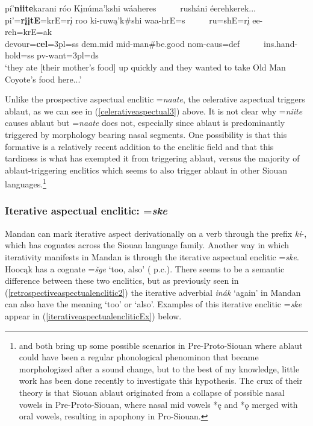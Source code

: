 \begin{exe}
\begin{xlist}
	\item\label{celerativeaspectual4}
	\glll pí'\textbf{niite}karani róo Kįnúma'kshi wáaheres ~ ~ ~ rusháni éerehkerek...\\
	pi'=\textbf{rįįtE}=krE=rį roo ki-ruwą'k\#shi waa-hrE=s ~ ~ ~ ru=shE=rį ee-reh=krE=ak\\
	\textnormal{devour}=\textbf{cel}=3pl=ss dem.mid mid-\textnormal{man}\#\textnormal{be.good} nom-caus=def ~ ~ ~  ins.hand-\textnormal{hold}=ss pv-\textnormal{want}=3pl=ds\\
	\glt `they ate [their mother's food] up quickly and they wanted to take Old Man Coyote's food here...' \citep[27]{hollow1973a}
	
	\end{xlist}

\end{exe}

Unlike the prospective aspectual enclitic =\textit{naate}, the celerative aspectual triggers ablaut, as we can see in (\ref{celerativeaspectual3}) above. It is not clear why =\textit{niite} causes ablaut but =\textit{naate} does not, especially since ablaut is predominantly triggered by morphology bearing nasal segments. One possibility is that this formative is a relatively recent addition to the enclitic field and that this tardiness is what has exempted it from triggering ablaut, versus the majority of ablaut-triggering enclitics which seems to also trigger ablaut in other Siouan languages.\footnote{\citet{jones1983b} and \citet{rood1983} both bring up some possible scenarios in Pre-Proto-Siouan where ablaut could have been a regular phonological phenominon that became morphologized after a sound change, but to the best of my knowledge, little work has been done recently to investigate this hypothesis. The crux of their theory is that Siouan ablaut originated from a collapse of possible nasal vowels in Pre-Proto-Siouan, where nasal mid vowels *ę and *ǫ merged with oral vowels, resulting in apophony in Pro-Siouan.}

\subsubsection{Iterative aspectual enclitic: =\textit{ske}}\label{iterativeaspectualenclitic}

Mandan can mark iterative aspect derivationally on a verb through the prefix \textit{ki}-, which has cognates across the Siouan language family. Another way in which iterativity manifests in Mandan is through the iterative aspectual enclitic =\textit{ske}. Hoocąk has a cognate =\textit{šge} `too, also' (\citeauthor{lundquist2015} p.c.). There seems to be a semantic difference between these two enclitics, but as previously seen in (\ref{retrospectiveaspectualenclitic2}) the iterative adverbial \textit{inák} `again' in Mandan can also have the meaning `too' or `also'. Examples of this iterative enclitic =\textit{ske} appear in (\ref{iterativeaspectualencliticEx}) below.

